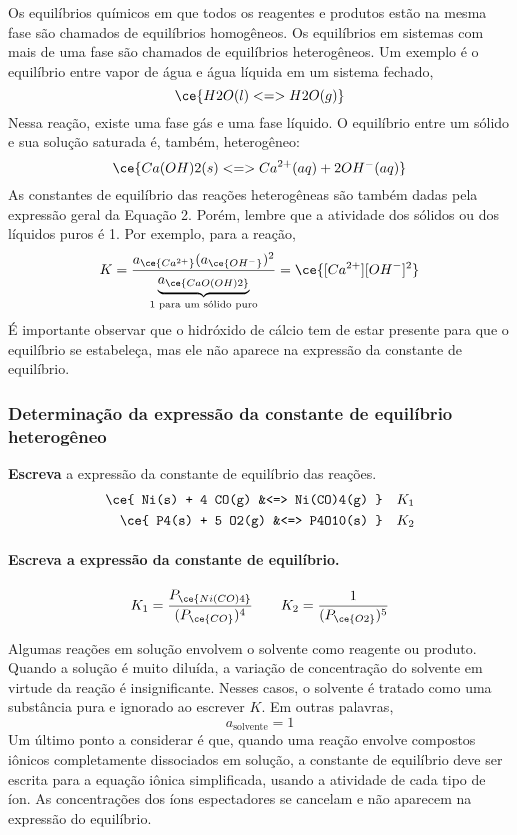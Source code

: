 Os equilíbrios químicos em que todos os reagentes e produtos estão na mesma fase são chamados de equilíbrios homogêneos. Os equilíbrios em sistemas
com mais de uma fase são chamados de equilíbrios heterogêneos. Um exemplo é o equilíbrio entre vapor de água e água líquida em um sistema fechado, \[
    \ce{ H2O(l) <=> H2O(g) }
\] Nessa reação, existe uma fase gás e uma fase líquido. O equilíbrio entre um sólido e sua solução saturada é, também, heterogêneo: \[
    \ce{ Ca(OH)2(s) <=> Ca^{2+}(aq) + 2 OH^-(aq) }
\] As constantes de equilíbrio das reações heterogêneas são também dadas pela expressão geral da Equação 2. Porém, lembre que a atividade dos sólidos
ou dos líquidos puros é 1. Por exemplo, para a reação, \[
    K = \dfrac{ a_{\ce{Ca^{2+}}} (a_{\ce{OH^-}})^2 }{ \underbrace{ a_{\ce{CaO(OH)2}} }_{ \text{1 para um sólido puro} } } 
        = \ce{ [Ca^{2+}][OH^-]^2 }
\] É importante observar que o hidróxido de cálcio tem de estar presente para que o equilíbrio se estabeleça, mas ele não aparece na expressão da
constante de equilíbrio.

\begin{example}

\subsubsection{Determinação da expressão da constante de equilíbrio heterogêneo}

\textbf{Escreva} a expressão da constante de equilíbrio das reações. \[
\begin{aligned}
    \ce{ Ni(s) + 4 CO(g) &<=> Ni(CO)4(g) } && K_1 \\
    \ce{ P4(s) + 5 O2(g) &<=> P4O10(s) }   && K_2
\end{aligned}
\]

\paragraph{Escreva a expressão da constante de equilíbrio.}

\[
    K_1 = \dfrac{ P_{\ce{Ni(CO)4}} }{ (P_{\ce{CO}})^4 } 
    \qquad
    K_2 = \dfrac{ 1 }{ (P_{\ce{O2}})^5 } 
\]

\end{example}

Algumas reações em solução envolvem o solvente como reagente ou produto. Quando a solução é muito diluída, a variação de concentração do solvente em
virtude da reação é insignificante. Nesses casos, o solvente é tratado como uma substância pura e ignorado ao escrever \(K\). Em outras palavras, \[
    a_\text{solvente} = 1
\] Um último ponto a considerar é que, quando uma reação envolve compostos iônicos completamente dissociados em solução, a constante de equilíbrio
deve ser escrita para a equação iônica simplificada, usando a atividade de cada tipo de íon. As concentrações dos íons espectadores se cancelam e não
aparecem na expressão do equilíbrio.

